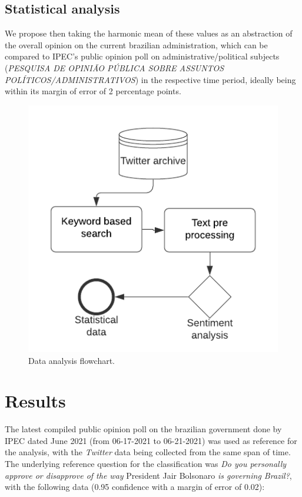 \documentclass[conference]{IEEEtran}
\begin{document}
\subsection{Statistical analysis}
\label{sec:orgb42949f}
We propose then taking the harmonic mean of these values as an abstraction of the overall opinion on the current brazilian administration, which can be compared to IPEC's public opinion poll on administrative/political subjects (\emph{PESQUISA DE OPINIÃO PÚBLICA SOBRE ASSUNTOS POLÍTICOS/ADMINISTRATIVOS}) \cite{IpecPesquisas} in the respective time period, ideally being within its margin of error of 2 percentage points.

\begin{figure}[H]
\centering
\includegraphics[width=\linewidth]{./Metodologia.png}
\caption{\label{fig:dataflow}Data analysis flowchart.}
\end{figure}

\section{Results}
\label{sec:orgaacc6b8}
The latest compiled public opinion poll on the brazilian government done by IPEC dated June 2021 (from 06-17-2021 to 06-21-2021) \cite{AvaliacaoGovernoIPEC} was used as reference for the analysis, with the \emph{Twitter} data being collected from the same span of time. The underlying reference question for the classification was \emph{Do you personally approve or disapprove of the way} President Jair Bolsonaro \emph{is governing Brazil?}, with the following data (0.95 confidence with a margin of error of 0.02):
\end{document}

